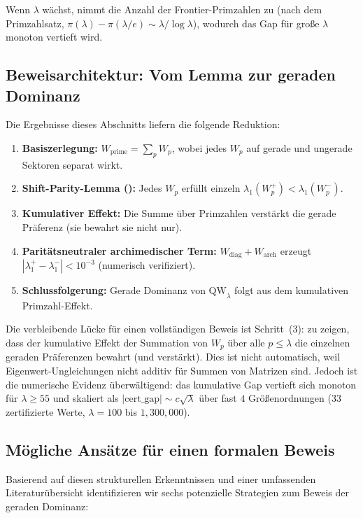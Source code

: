 ﻿\documentclass[12pt,a4paper]{article}
\theoremstyle{definition}
\theoremstyle{remark}
\begin{document}
Wenn $\lambda$ wächst, nimmt die Anzahl der Frontier-Primzahlen zu (nach dem Primzahlsatz, $\pi(\lambda) - \pi(\lambda/e) \sim \lambda/\log\lambda$), wodurch das Gap für große $\lambda$ monoton vertieft wird.

\subsection{Beweisarchitektur: Vom Lemma zur geraden Dominanz}

Die Ergebnisse dieses Abschnitts liefern die folgende Reduktion:

\begin{enumerate}
  \item \textbf{Basiszerlegung:} $W_{\mathrm{prime}} = \sum_p W_p$, wobei jedes $W_p$ auf gerade und ungerade Sektoren separat wirkt.
  \item \textbf{Shift-Parity-Lemma ():} Jedes $W_p$ erfüllt einzeln $\lambda_1(W_p^+) < \lambda_1(W_p^-)$.
  \item \textbf{Kumulativer Effekt:} Die Summe über Primzahlen verstärkt die gerade Präferenz (sie bewahrt sie nicht nur).
  \item \textbf{Paritätsneutraler archimedischer Term:} $W_{\mathrm{diag}} + W_{\mathrm{arch}}$ erzeugt $|\lambda_1^+ - \lambda_1^-| < 10^{-3}$ (numerisch verifiziert).
  \item \textbf{Schlussfolgerung:} Gerade Dominanz von $\mathrm{QW}_\lambda$ folgt aus dem kumulativen Primzahl-Effekt.
\end{enumerate}

\noindent Die verbleibende Lücke für einen vollständigen Beweis ist Schritt~(3): zu zeigen, dass der kumulative Effekt der Summation von $W_p$ über alle $p \leq \lambda$ die einzelnen geraden Präferenzen bewahrt (und verstärkt). Dies ist nicht automatisch, weil Eigenwert-Ungleichungen nicht additiv für Summen von Matrizen sind. Jedoch ist die numerische Evidenz überwältigend: das kumulative Gap vertieft sich monoton für $\lambda \geq 55$ und skaliert als $|\mathrm{cert\_gap}| \sim c\sqrt{\lambda}$ über fast $4$ Größenordnungen ($33$ zertifizierte Werte, $\lambda = 100$ bis $1{,}300{,}000$).

\subsection{M\"ogliche Ans\"atze f\"ur einen formalen Beweis}

Basierend auf diesen strukturellen Erkenntnissen und einer umfassenden Literaturübersicht identifizieren wir sechs potenzielle Strategien zum Beweis der geraden Dominanz:
\end{document}
